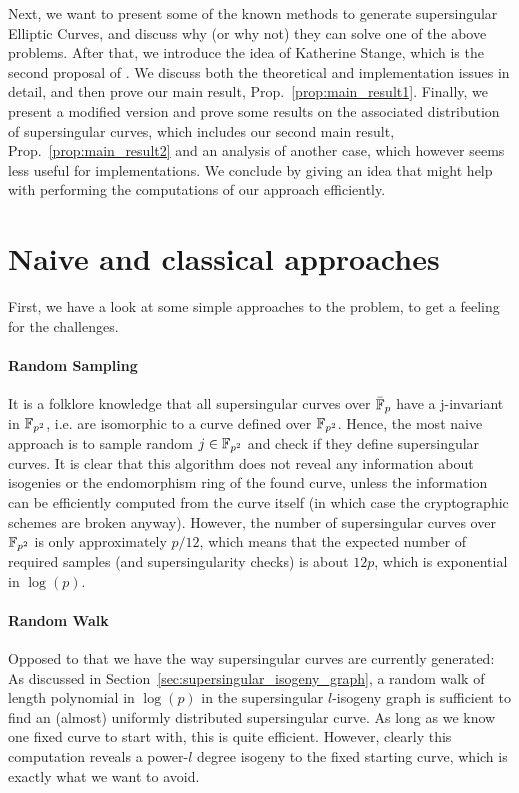 Next, we want to present some of the known methods to generate supersingular Elliptic Curves, and discuss why (or why not) they can solve one of the above problems.
After that, we introduce the idea of Katherine Stange, which is the second proposal of \cite{base_paper}.
We discuss both the theoretical and implementation issues in detail, and then prove our main result, Prop.~\ref{prop:main_result1}.
Finally, we present a modified version and prove some results on the associated distribution of supersingular curves, which includes our second main result, Prop.~\ref{prop:main_result2} and an analysis of another case, which however seems less useful for implementations.
We conclude by giving an idea that might help with performing the computations of our approach efficiently. 

\section{Naive and classical approaches}
\label{prop:naive_classical_approaches}
First, we have a look at some simple approaches to the problem, to get a feeling for the challenges.

\paragraph{Random Sampling} It is a folklore knowledge that all supersingular curves over $\bar{\mathbb{F}}_p$ have a j-invariant in $\mathbb{F}_{p^2}$, i.e. are isomorphic to a curve defined over $\mathbb{F}_{p^2}$.
Hence, the most naive approach is to sample random $j \in \mathbb{F}_{p^2}$ and check if they define supersingular curves.
It is clear that this algorithm does not reveal any information about isogenies or the endomorphism ring of the found curve, unless the information can be efficiently computed from the curve itself (in which case the cryptographic schemes are broken anyway).
However, the number of supersingular curves over $\mathbb{F}_{p^2}$ is only approximately $p/12$, which means that the expected number of required samples (and supersingularity checks) is about $12p$, which is exponential in $\log(p)$.

\paragraph{Random Walk} Opposed to that we have the way supersingular curves are currently generated:
As discussed in Section~\ref{sec:supersingular_isogeny_graph}, a random walk of length polynomial in $\log(p)$ in the supersingular $l$-isogeny graph is sufficient to find an (almost) uniformly distributed supersingular curve.
As long as we know one fixed curve to start with, this is quite efficient.
However, clearly this computation reveals a power-$l$ degree isogeny to the fixed starting curve, which is exactly what we want to avoid.

